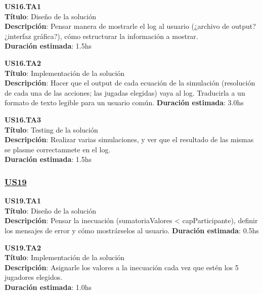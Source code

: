 \begin{tcolorbox}
\textbf{US16.TA1} \\
\textbf{Título}:  Diseño de la solución\\
\textbf{Descripción}:  Pensar manera de mostrarle el log al usuario (¿archivo de output? ¿interfaz gráfica?), cómo estructurar la información a mostrar. \\
\textbf{Duración estimada}: 1.5hs
\end{tcolorbox}
\vspace{10pt}

\begin{tcolorbox}
\textbf{US16.TA2} \\
\textbf{Título}: Implementación de la solución\\
\textbf{Descripción}: Hacer que el output de cada ecuación de la simulación (resolución de cada una de las acciones; las jugadas elegidas) vaya al log. Traducirla a un formato de texto legible para un usuario común.
\textbf{Duración estimada}: 3.0hs
\end{tcolorbox}
\vspace{10pt}

\begin{tcolorbox}
\textbf{US16.TA3} \\
\textbf{Título}: Testing de la solución \\
\textbf{Descripción}: Realizar varias simulaciones, y ver que el resultado de las mismas se plasme correctamnete en el log.\\
\textbf{Duración estimada}: 1.5hs
\end{tcolorbox}
\vspace{10pt}



\subsubsection*{\underline{US19}}

\begin{tcolorbox}
\textbf{US19.TA1} \\
\textbf{Título}:  Diseño de la solución\\
\textbf{Descripción}: Pensar la inecuación (sumatoriaValores < capParticipante), definir los mensajes de error y cómo mostrárselos al usuario. 
\textbf{Duración estimada}: 0.5hs
\end{tcolorbox}
\vspace{10pt}

\begin{tcolorbox}
\textbf{US19.TA2} \\
\textbf{Título}: Implementación de la solución \\
\textbf{Descripción}: Asignarle los valores a la inecuación cada vez que estén los 5 jugadores elegidos. \\
\textbf{Duración estimada}: 1.0hs
\end{tcolorbox}
\vspace{10pt}

